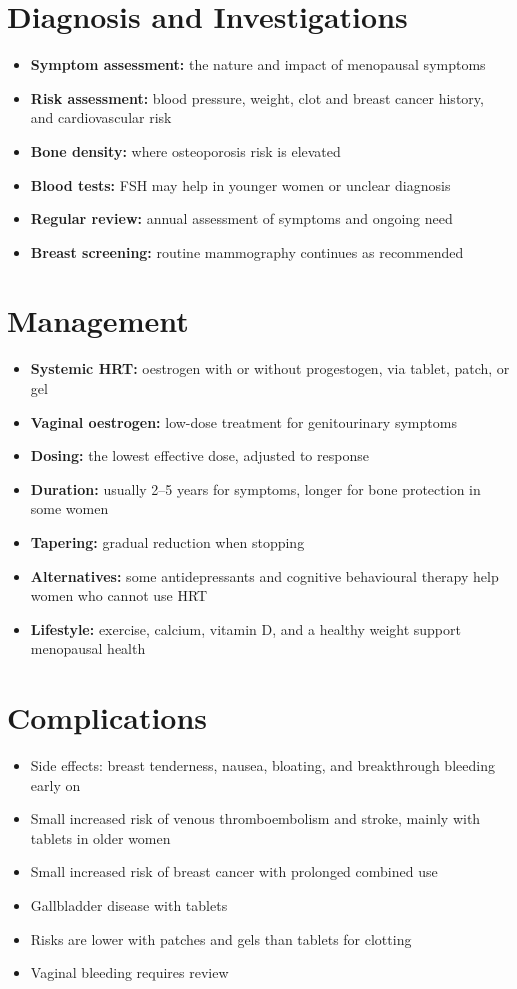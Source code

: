 \section*{Diagnosis and Investigations}
\begin{itemize}
    \item \textbf{Symptom assessment:} the nature and impact of menopausal symptoms
    \item \textbf{Risk assessment:} blood pressure, weight, clot and breast cancer history, and cardiovascular risk
    \item \textbf{Bone density:} where osteoporosis risk is elevated
    \item \textbf{Blood tests:} FSH may help in younger women or unclear diagnosis
    \item \textbf{Regular review:} annual assessment of symptoms and ongoing need
    \item \textbf{Breast screening:} routine mammography continues as recommended
\end{itemize}

\section*{Management}
\begin{itemize}
    \item \textbf{Systemic HRT:} oestrogen with or without progestogen, via tablet, patch, or gel
    \item \textbf{Vaginal oestrogen:} low-dose treatment for genitourinary symptoms
    \item \textbf{Dosing:} the lowest effective dose, adjusted to response
    \item \textbf{Duration:} usually 2--5 years for symptoms, longer for bone protection in some women
    \item \textbf{Tapering:} gradual reduction when stopping
    \item \textbf{Alternatives:} some antidepressants and cognitive behavioural therapy help women who cannot use HRT
    \item \textbf{Lifestyle:} exercise, calcium, vitamin D, and a healthy weight support menopausal health
\end{itemize}

\section*{Complications}
\begin{itemize}
    \item Side effects: breast tenderness, nausea, bloating, and breakthrough bleeding early on
    \item Small increased risk of venous thromboembolism and stroke, mainly with tablets in older women
    \item Small increased risk of breast cancer with prolonged combined use
    \item Gallbladder disease with tablets
    \item Risks are lower with patches and gels than tablets for clotting
    \item Vaginal bleeding requires review
\end{itemize}

